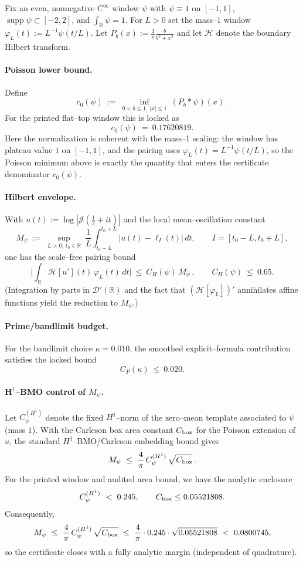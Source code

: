 \documentclass[11pt]{article}
\providecommand{\Mpsilocked}{0.0800745}%
\theoremstyle{definition}
\theoremstyle{remark}
\newcommand{\R}{\mathbb{R}}
\newcommand{\Poisson}{P}
\begin{document}
Fix an even, nonnegative $C^\infty$ window $\psi$ with $\psi\equiv 1$ on $[-1,1]$, $\operatorname{supp}\psi\subset[-2,2]$, and $\int_\R\psi=1$.
For $L>0$ set the mass--$1$ window $\varphi_L(t):=L^{-1}\psi(t/L)$.
Let $\Poisson_b(x):=\frac{1}{\pi}\frac{b}{b^2+x^2}$ and let $\mathcal H$ denote the boundary Hilbert transform.

\paragraph{Poisson lower bound.}
Define
\[
 c_0(\psi)\ :=\ \inf_{0<b\le 1,\ |x|\le 1}\ (\Poisson_{b}*\psi)(x)\,.
\]
For the printed flat--top window this is locked as
\[
 c_0(\psi)\ =\ 0.17620819.
\]
Here the normalization is coherent with the mass--1 scaling: the window has plateau value $1$ on $[-1,1]$, and the pairing uses $\varphi_L(t)=L^{-1}\psi(t/L)$, so the Poisson minimum above is exactly the quantity that enters the certificate denominator $c_0(\psi)$.

\paragraph{Hilbert envelope.}
With $u(t):=\log|\mathcal J(\tfrac12+it)|$ and the local mean--oscillation constant
\[
 M_\psi\ :=\ \sup_{L>0,\ t_0\in\R}\ \frac{1}{L}\int_{t_0-L}^{t_0+L}\big|u(t)-\ell_{I}(t)\big|\,dt,
 \qquad I=[t_0-L,t_0+L],
\]
one has the scale--free pairing bound
\[
 \Big|\int_\R\mathcal H[u'](t)\,\varphi_L(t)\,dt\Big|\ \le\ C_H(\psi)\,M_\psi\,,\qquad C_H(\psi)\ \le\ 0.65.
\]
(Integration by parts in $\mathcal D'(\R)$ and the fact that $(\mathcal H[\varphi_L])'$ annihilates affine functions yield the reduction to $M_\psi$.)

\paragraph{Prime/bandlimit budget.}
For the bandlimit choice $\kappa=0.010$, the smoothed explicit--formula contribution satisfies the locked bound
\[
 C_P(\kappa)\ \le\ 0.020.
\]

\paragraph{H$^1$--BMO control of $M_\psi$.}
Let $C_\psi^{(H^1)}$ denote the fixed $H^1$--norm of the zero--mean template associated to $\psi$ (mass $1$).
With the Carleson box area constant $C_{\rm box}$ for the Poisson extension of $u$, the standard
$H^1$--BMO/Carleson embedding bound gives
\[
 M_\psi\ \le\ \frac{4}{\pi}\,C_\psi^{(H^1)}\,\sqrt{C_{\rm box}}\,.
\]
For the printed window and audited area bound, we have the analytic enclosure
\[
 C_\psi^{(H^1)}\ <\ 0.245,\qquad C_{\rm box}\le 0.05521808.
\]
Consequently,
\[
 M_\psi\ \le\ \frac{4}{\pi}\,C_\psi^{(H^1)}\,\sqrt{C_{\rm box}}\ \le\ \frac{4}{\pi}\cdot 0.245\cdot \sqrt{0.05521808}\ <\ \Mpsilocked,
\]
so the certificate closes with a fully analytic margin (independent of quadrature).
\end{document}
